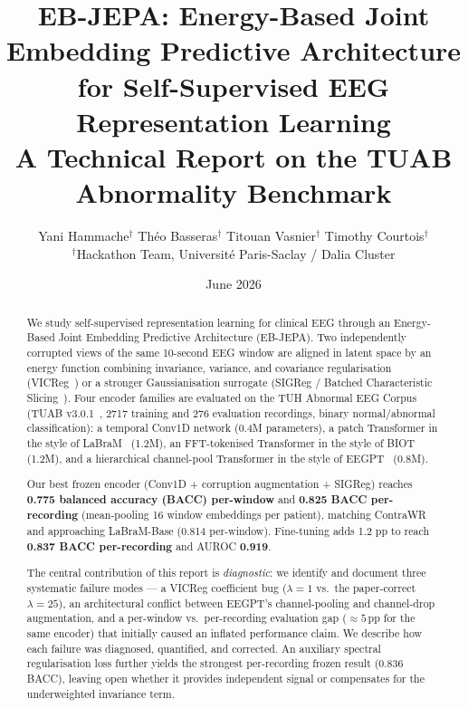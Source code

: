 \documentclass[11pt,a4paper]{article}
\title{\LARGE\bfseries EB-JEPA: Energy-Based Joint Embedding Predictive Architecture\\
for Self-Supervised EEG Representation Learning\\[4pt]
{\large A Technical Report on the TUAB Abnormality Benchmark}}
\author{
  Yani Hammache$^{\dagger}$ \quad
  Th\'eo Basseras$^{\dagger}$ \quad
  Titouan Vasnier$^{\dagger}$ \quad
  Timothy Courtois$^{\dagger}$\\[4pt]
  \small$^{\dagger}$Hackathon Team, Universit\'e Paris-Saclay / Dalia Cluster
}
\date{June 2026}
\begin{document}
\maketitle

\begin{abstract}
We study self-supervised representation learning for clinical EEG through an
Energy-Based Joint Embedding Predictive Architecture (EB-JEPA).  Two independently
corrupted views of the same 10-second EEG window are aligned in latent space by an
energy function combining invariance, variance, and covariance regularisation
(VICReg~\cite{vicreg}) or a stronger Gaussianisation surrogate
(SIGReg / Batched Characteristic Slicing~\cite{epps1983}).
Four encoder families are evaluated on the TUH Abnormal EEG Corpus
(TUAB v3.0.1~\cite{tuab}, 2717 training and 276 evaluation recordings,
binary normal/abnormal classification):
a temporal Conv1D network (0.4M parameters), a patch Transformer in the style of
LaBraM~\cite{labram} (1.2M), an FFT-tokenised Transformer in the style of
BIOT~\cite{biot} (1.2M), and a hierarchical channel-pool Transformer in the
style of EEGPT~\cite{eegpt} (0.8M).

Our best frozen encoder (Conv1D + corruption augmentation + SIGReg) reaches
\textbf{0.775 balanced accuracy (BACC) per-window} and \textbf{0.825 BACC per-recording}
(mean-pooling 16 window embeddings per patient), matching ContraWR and approaching
LaBraM-Base (0.814 per-window).  Fine-tuning adds 1.2 pp to reach \textbf{0.837 BACC
per-recording} and AUROC \textbf{0.919}.

The central contribution of this report is \emph{diagnostic}:
we identify and document three systematic failure modes ---
a VICReg coefficient bug ($\lambda{=}1$ vs.\ the paper-correct $\lambda{=}25$),
an architectural conflict between EEGPT's channel-pooling and channel-drop
augmentation, and a per-window vs.\ per-recording evaluation gap
(${\approx}5$\,pp for the same encoder) that initially caused an inflated
performance claim.  We describe how each failure was diagnosed, quantified, and
corrected.  An auxiliary spectral regularisation loss further yields the strongest
per-recording frozen result (0.836 BACC), leaving open whether it provides
independent signal or compensates for the underweighted invariance term.
\end{abstract}

\tableofcontents
\newpage
\end{document}
